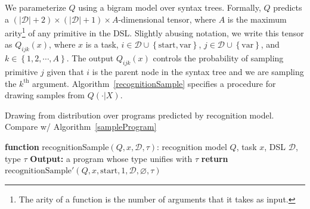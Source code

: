 \documentclass{article}
\begin{document}
We parameterize $Q$ using a bigram model over syntax trees.
Formally,
$Q$ predicts a $(|\mathcal{D}|+2)\times (|\mathcal{D}|+1)\times A$-dimensional tensor,
where $A$ is the maximum arity\footnote{The arity of a function is the number of arguments that it takes as input.} of any primitive in the DSL.
Slightly abusing notation, we write this tensor as $Q_{ijk}(x)$,
where $x$ is a task,
$i\in \mathcal{D}\cup\left\{\text{start},\text{var}\right\}$,
$j\in \mathcal{D}\cup\left\{\text{var} \right\}$,
and $k\in \left\{1,2,\cdots,A \right\}$.
The output $Q_{ijk}(x)$
controls the probability of
sampling primitive $j$ given that
$i$ is the parent node in the syntax tree
and we are sampling the $k^{\text{th}}$ argument.
Algorithm~\ref{recognitionSample}
specifies a procedure for drawing samples from $Q(\cdot |X)$.
 \begin{algorithm}
   \caption{Drawing from distribution over programs predicted by recognition model. Compare w/ Algorithm~\ref{sampleProgram}}
   \label{recognitionSample}
   \begin{algorithmic}[1]
     \State \textbf{function} recognitionSample$(Q, x, \mathcal{D}, \tau)$:
      recognition model $Q$, task $x$, DSL $\mathcal{D}$, type $\tau$
     \State \textbf{Output:} a program whose type unifies with $\tau$
     \State \textbf{return } $\text{recognitionSample}'(Q,x,\text{start},1,\mathcal{D},\varnothing,\tau)$
     \Statex


\end{algorithmic}
\end{algorithm}
\end{document}
